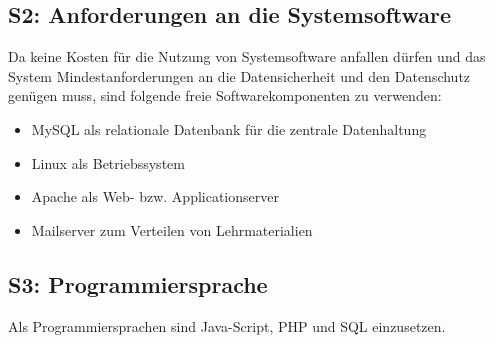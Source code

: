 \documentclass[10pt,a4paper]{scrartcl}
\begin{document}
\subsection{S2: Anforderungen an die Systemsoftware}
Da keine Kosten für die Nutzung von Systemsoftware anfallen dürfen und das System Mindestanforderungen an die Datensicherheit und den Datenschutz genügen muss, sind folgende freie Softwarekomponenten zu verwenden:
\begin{itemize}
\item MySQL als relationale Datenbank für die zentrale Datenhaltung
\item Linux als Betriebssystem
\item Apache als Web- bzw. Applicationserver
\item Mailserver zum Verteilen von Lehrmaterialien
\end{itemize}

\subsection{S3: Programmiersprache}
Als Programmiersprachen sind Java-Script, PHP und SQL einzusetzen.
\end{document}
